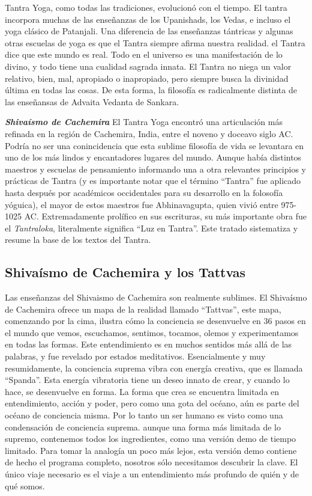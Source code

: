 Tantra Yoga, como todas las tradiciones, evolucionó con el tiempo. El tantra incorpora muchas de las enseñanzas de los Upanishads, los Vedas, e incluso el yoga clásico de Patanjali. Una diferencia de las enseñanzas tántricas y algunas otras escuelas de yoga es que el Tantra siempre afirma nuestra realidad. el Tantra dice que este mundo es real. Todo en el universo es una manifestación de lo divino, y todo tiene una cualidad sagrada innata. El Tantra no niega un valor relativo, bien, mal, apropiado o inapropiado, pero siempre busca la divinidad última en todas las cosas. De esta forma, la filosofía es radicalmente distinta de las enseñansas de Advaita Vedanta de Sankara.

\textbf{\textit{Shivaísmo de Cachemira}}
El Tantra Yoga encontró una articulación más refinada en la región de Cachemira, India, entre el noveno y doceavo siglo AC. Podría no ser una conincidencia que esta sublime filosofía de vida se levantara en uno de los más lindos y encantadores lugares del mundo. Aunque había distintos maestros y escuelas de pensamiento informando una a otra relevantes principios y prácticas de Tantra (y es importante notar que el t\'ermino ``Tantra'' fue aplicado hasta despu\'es por acad\'emicos occidentales para su desarrollo en la folosofía yóguica), el mayor de estos maestros fue Abhinavagupta, quien vivió entre 975-1025 AC. Extremadamente prolífico en sus escrituras, su más importante obra fue el \textit{Tantraloka}, literalmente significa ``Luz en Tantra''. Este tratado sistematiza y resume la base de los textos del Tantra.

\subsection{Shivaísmo de Cachemira y los Tattvas}
Las enseñanzas del Shivaismo de Cachemira son realmente sublimes. El Shivaísmo de Cachemira ofrece un mapa de la realidad llamado ``Tattvas'', este mapa, comenzando por la cima, ilustra cómo la conciencia se desenvuelve en 36 pasos en el mundo que vemos, escuchamos, sentimos, tocamos, olemos y experimentamos en todas las formas. Este entendimiento es en muchos sentidos más allá de las palabras, y fue revelado por estados meditativos. Esencialmente y muy resumidamente, la conciencia suprema vibra con energía creativa, que es llamada ``Spanda''. Esta energía vibratoria tiene un deseo innato de crear, y cuando lo hace, se desenvuelve en forma. La forma que crea se encuentra limitada en entendimiento, acción y poder, pero como una gota del oc\'eano, aún es parte del oc\'eano de conciencia misma. Por lo tanto un ser humano es visto como una condensación de conciencia suprema. aunque una forma más limitada de lo supremo, contenemos todos los ingredientes, como una versión demo de tiempo limitado. Para tomar la analogía un poco más lejos, esta versión demo contiene de hecho el programa completo, nosotros sólo necesitamos descubrir la clave. El único viaje necesario es el viaje a un entendimiento más profundo de qui\'en y de qu\'e somos.


